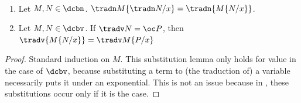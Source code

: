 \begin{lemma}[Substitution]\label{lem:trad_subst}~
	\begin{enumerate}
		\item Let $M,N\in\dcbn$. $\tradn M\{\tradn
			N/x\}=\tradn{M\{N/x\}}$.
		\item Let $M,N\in\dcbv$. If $\tradv N=\oc P$, then
			$\tradv{M\{N/x\}}=\tradv M\{P/x\}$
	\end{enumerate}
\end{lemma}
\begin{proof}
	Standard induction on $M$. This substitution lemma only holds for value in the
	case of $\dcbv$, because substituting a term to (the traduction of) a variable
	necessarily puts it under an exponential. This is not an issue because in \dcbv, these
	substitutions occur only if it is the case.
\end{proof}

